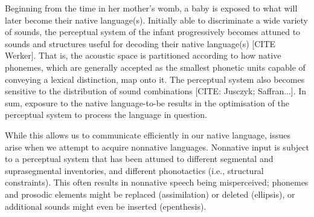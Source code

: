 




Beginning from the time in her mother's womb, a baby is exposed to what will later become their native language(s). Initially able to discriminate a wide variety of sounds, the perceptual system of the infant progressively becomes attuned to sounds and structures useful for decoding their native language(s) [CITE Werker]. That is, the acoustic space is partitioned according to how native phonemes, which are generally accepted as the smallest phonetic units capable of conveying a lexical distinction, map onto it. The perceptual system also becomes sensitive to the distribution of sound combinations [CITE: Jusczyk; Saffran...]. In sum, %
exposure to the native language-to-be results in the optimisation of the perceptual system to process the language in question.

While this allows us to communicate efficiently in our native language, issues arise when we attempt to acquire nonnative languages. Nonnative input is subject to a perceptual system that has been attuned to different segmental and suprasegmental inventories, and different phonotactics (i.e., structural constraints). This often results in nonnative speech being misperceived; phonemes and prosodic elements might be replaced (assimilation) or deleted (ellipsis), or additional sounds might even be inserted (epenthesis).

